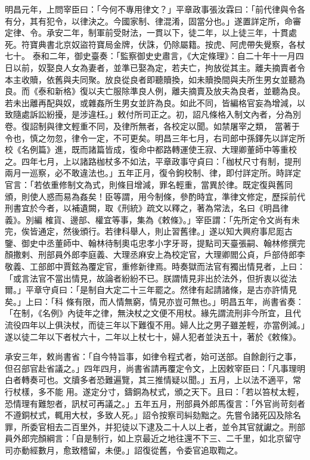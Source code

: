 \begin{pinyinscope}
 明昌元年，上問宰臣曰：「今何不專用律文？」平章政事張汝霖曰：「前代律與令各有分，其有犯令，以律決之。今國家制、律混淆，固當分也。」遂置詳定所，命審定律、令。承安二年，制軍前受財法，一貫以下，徒二年，以上徒三年，十貫處死。符寶典書北京奴盜符寶局金牌，伏誅，仍除屬籍。按虎、阿虎帶失覺察，各杖七十。
 泰和二年，御史臺奏：「監察御史史肅言，《大定條理》：自二十年十一月四日以前，奴娶良人女為妻者，並準已娶為定，若夫亡，拘放從其主。離夫摘賣者令本主收贖，依舊與夫同聚。放良從良者即聽贖換，如未贖換間與夫所生男女並聽為良。而《泰和新格》復以夫亡服除準良人例，離夫摘賣及放夫為良者，並聽為良。若未出離再配與奴，或雜姦所生男女並許為良。如此不同，皆編格官妄為增減，以致隨處訴訟紛擾，是涉違枉。」敕付所司正之。初，詔凡條格入制文內者，分為別卷。復詔制與律文輕重不同，及律所無者，各校定以聞。如禁屠宰之類，
 當著于令也，慎之勿忽，律令一定，不可更矣。明昌三年七月，右司郎中孫鐸先以詳定所校《名例篇》進，既而諸篇皆成，復命中都路轉運使王寂、大理卿董師中等重校之。四年七月，上以諸路枷杖多不如法，平章政事守貞曰：「枷杖尺寸有制，提刑兩月一巡察，必不敢違法也。」五年正月，復令鉤校制、律，即付詳定所。時詳定官言：「若依重修制文為式，則條目增減，罪名輕重，當異於律。既定復與舊同頒，則使人惑而易為姦矣！臣等謂，用今制條，參酌時宜，準律文修定，歷採前代刑書宜於今者，以補遺闕，取《刑統》疏文以釋之，著為常法，名曰《明昌律義》。別編
 榷貨、邊部、權宜等事，集為《敕條》。」宰臣謂：「先所定令文尚有未完，俟皆通定，然後頒行。若律科舉人，則止習舊律。」遂以知大興府事尼厖古鑒、御史中丞董師中、翰林待制奧屯忠孝小字牙哥，提點司天臺張嗣、翰林修撰完顏撒剌、刑部員外郎李庭義、大理丞麻安上為校定官，大理卿閻公貞，戶部侍郎李敬義、工部郎中賈鉉為覆定官，重修新律焉。時奏獄而法官有獨出情見者，上曰：「或言法官不當出情見，故論者紛紛不已。朕謂情見非出於法外，但折衷以從法爾。」平章守貞曰：「是制自大定二十三年罷之。然律有起請諸條，是古亦許情見矣。」上曰：「科
 條有限，而人情無窮，情見亦豈可無也。」明昌五年，尚書省奏：「在制，《名例》內徒年之律，無決杖之文便不用杖。緣先謂流刑非今所宜，且代流役四年以上俱決杖，而徒三年以下難復不用。婦人比之男子雖差輕，亦當例減。」遂以徒二年以下者杖六十，二年以上杖七十，婦人犯者並決五十，著於《敕條》。



 承安三年，敕尚書省：「自今特旨事，如律令程式者，始可送部。自餘創行之事，但召部官赴省議之。」四年四月，尚書省請再覆定令文，上因敕宰臣曰：「凡事理明白者轉奏可也。文牘多者恐難遍覽，其三推情疑以聞。」五月，上以法不適平，常行杖樣，多不能
 用。遂定分寸，鑄銅為杖式，頒之天下。且曰：「若以笞杖太輕，恐情理有難恕者，訊杖可再議之。」五年五月，刑部員外郎馬復言：「外官尚苛刻者不遵銅杖式，輒用大杖，多致人死。」詔令按察司糾劾黜之。先嘗令諸死囚及除名罪，所委官相去二百里外，并犯徒以下逮及二十人以上者，並令其官就讞之。刑部員外郎完顏綱言：「自是制行，如上京最近之地往還不下三、二千里，如北京留守司亦動經數月，愈致稽留，未便。」詔復從舊，令委官追取鞫之。




\end{pinyinscope}

